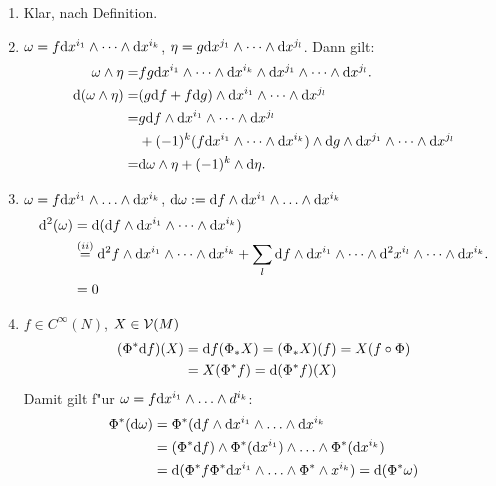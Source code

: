 \begin{bew}
\begin{enumerate}[label=(\roman*),leftmargin=*,widest=iii]
\item
	Klar, nach Definition.
\item
	$\omega = f\mathrm{d} x^{i_1} \wedge \cdots \wedge \mathrm{d} x^{i_k}$, $\eta = g \mathrm{d} x^{j_1} \wedge \cdots \wedge \mathrm{d} x^{j_l}$. Dann gilt:
	\begin{align*}
		\omega \wedge \eta =& fg \mathrm{d} x^{i_1} \wedge \cdots \wedge \mathrm{d} x^{i_k} \wedge \mathrm{d} x^{j_1} \wedge \cdots \wedge \mathrm{d} x^{j_l}.\\
		\mathrm{d} (\omega \wedge \eta) =& (g \mathrm{d} f + f \mathrm{d} g) \wedge \mathrm{d} x^{i_1} \wedge \cdots \wedge \mathrm{d} x^{j_l}\\
		= & g \mathrm{d} f \wedge \mathrm{d} x^{i_1} \wedge \cdots \wedge \mathrm{d} x^{j_l}\\
		& + (-1)^k(f \mathrm{d} x^{i_1} \wedge \cdots \wedge \mathrm{d} x^{i_k}) \wedge \mathrm{d} g \wedge \mathrm{d} x^{j_1} \wedge \cdots \wedge \mathrm{d} x^{j_l}\\
		= & \mathrm{d} \omega \wedge \eta + (-1)^k \wedge \mathrm{d} \eta.
	\end{align*}
\item
	$\omega = f \mathrm{d} x^{i_1} \wedge \ldots  \wedge \mathrm{d} x^{i_k}$, $\mathrm{d} \omega := \mathrm{d} f \wedge \mathrm{d} x^{i_1} \wedge \ldots \wedge \mathrm{d} x^{i_k}$
	\begin{align*}
		\mathrm{d}^2(\omega) & = \mathrm{d}(\mathrm{d} f \wedge \mathrm{d} x^{i_1} \wedge \cdots \wedge \mathrm{d} x^{i_k})\\
		& \overset{(ii)}{=} \mathrm{d}^2f \wedge \mathrm{d} x^{i_1} \wedge \cdots \wedge \mathrm{d} x^{i_k} + \sum_l \mathrm{d} f \wedge \mathrm{d} x^{i_1} \wedge \cdots \wedge \mathrm{d}^2x^{i_l} \wedge \cdots \wedge \mathrm{d} x^{i_k}.\\
		& = 0
	\end{align*}
\item
	$f \in C^{\infty}(N)$, $X \in \operatorname{\mathcal{V}}(M)$
	\begin{align*}
		(\Phi^* \mathrm{d} f)(X) &= \mathrm{d} f(\Phi_* X) = (\Phi_* X)(f) = X(f \circ \Phi)\\
		&= X(\Phi^* f) = \mathrm{d} (\Phi^* f)(X)
	\end{align*}
	Damit gilt f"ur $\omega = f \mathrm{d} x^{i_1} \wedge \ldots \wedge d^{i_k}$:
	\begin{align*}
		\Phi^*(\mathrm{d} \omega) &= \Phi^*(\mathrm{d} f \wedge \mathrm{d} x^{i_1} \wedge \ldots \wedge \mathrm{d} x^{i_k}\\
		&= (\Phi^* \mathrm{d} f) \wedge \Phi^*(\mathrm{d} x^{i_1}) \wedge \ldots \wedge \Phi^*(\mathrm{d} x^{i_k})\\
		&= \mathrm{d} (\Phi^* f \Phi^* \mathrm{d} x^{i_1} \wedge \ldots \wedge \Phi^* \wedge x^{i_k}) = \mathrm{d} (\Phi^* \omega)
	\end{align*}
\end{enumerate}\end{bew}

